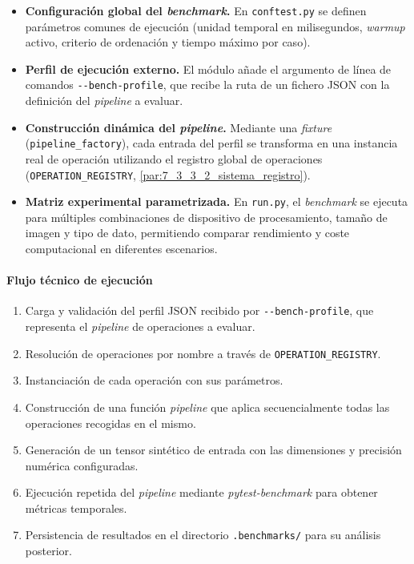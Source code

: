 \begin{itemize}[noitemsep]
    \item \textbf{Configuración global del \textit{benchmark}.} En \texttt{conftest.py} se definen
    parámetros comunes de ejecución (unidad temporal en milisegundos, \textit{warmup} activo,
    criterio de ordenación y tiempo máximo por caso).
    \item \textbf{Perfil de ejecución externo.} El módulo añade el argumento de línea de comandos
    \texttt{-{}-bench-profile}, que recibe la ruta de un fichero JSON con la definición del
    \textit{pipeline} a evaluar.
    \item \textbf{Construcción dinámica del \textit{pipeline}.} Mediante una \textit{fixture}
    (\texttt{pipeline\_factory}), cada entrada del perfil se transforma en una instancia real de
    operación utilizando el registro global de operaciones (\texttt{OPERATION\_REGISTRY}, \autoref{par:7_3_3_2_sistema_registro}).
    \item \textbf{Matriz experimental parametrizada.} En \texttt{run.py}, el \textit{benchmark}
    se ejecuta para múltiples combinaciones de dispositivo de procesamiento, tamaño de imagen y tipo de dato,
    permitiendo comparar rendimiento y coste computacional en diferentes escenarios.
\end{itemize}

\paragraph{Flujo técnico de ejecución} \label{par:7_3_6_2_flujo_tecnico_benchmark}

\begin{enumerate}[noitemsep]
    \item Carga y validación del perfil JSON recibido por \texttt{-{}-bench-profile}, que representa el \textit{pipeline} de operaciones a evaluar.
    \item Resolución de operaciones por nombre a través de \texttt{OPERATION\_REGISTRY}.
    \item Instanciación de cada operación con sus parámetros.
    \item Construcción de una función \textit{pipeline} que aplica secuencialmente todas las operaciones recogidas en el mismo.
    \item Generación de un tensor sintético de entrada con las dimensiones y precisión numérica configuradas.
    \item Ejecución repetida del \textit{pipeline} mediante \textit{pytest-benchmark} para obtener métricas temporales.
    \item Persistencia de resultados en el directorio \texttt{.benchmarks/} para su análisis posterior.
\end{enumerate}

